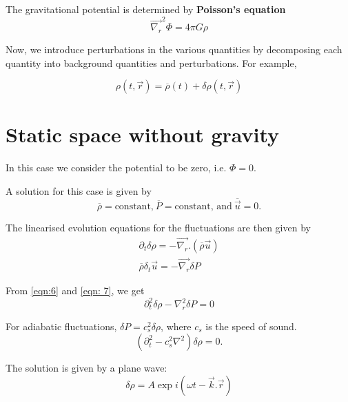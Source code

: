 \documentclass[a4,12pt,oneside]{report}
\begin{document}
   The gravitational potential is determined by {\bf Poisson's equation}
   \begin{equation}\label{key}
   \overrightarrow{\nabla_r}^2\Phi = 4\pi G\rho
   \end{equation}
   
   Now, we introduce perturbations in the various quantities by decomposing each quantity into background quantities and perturbations. For example,
   
   \begin{equation}\label{key}
   \rho(t,\vec{r}) = \overline{\rho}(t) + \delta\rho(t,\vec{r})
   \end{equation}
   
   \section{Static space without gravity}
	In this case we consider the potential to be zero, i.e. $ \Phi = 0 $.
	
	A solution for this case is given by
	\begin{equation}\label{key}
	\overline{\rho}=\text{constant,} \: \overline{P} = \text{constant, and} \: \overline{\vec{u}} = 0.
	\end{equation} 
	
	The linearised evolution equations for the fluctuations are then given by
	\begin{align}
	\partial_t \delta\rho = - \overrightarrow{\nabla_r}.(\overline{\rho}\vec{u}) \label{eqn:6}
	\\
	\overline{\rho}\delta_t \vec{u} = - \overrightarrow{\nabla_r}\delta P \label{eqn: 7}
	\end{align}
	
	From \eqref{eqn:6} and \eqref{eqn: 7}, we get	
	\begin{equation}\label{key}
	\partial_t^2 \delta \rho - \nabla_r^2 \delta P = 0
	\end{equation}
	
	For adiabatic fluctuations, $ \delta P = c_s^2 \delta \rho $, where $ c_s$ is the speed of sound.
	\begin{equation}\label{key}
	(\partial_t^2 - c_s^2\nabla^2) \delta \rho = 0.
	\end{equation}
	
	The solution is given by a plane wave:
	\begin{equation}\label{key}
	\delta \rho = A \exp i(\omega t - \vec{k}.\vec{r})
	\end{equation}
	
\end{document}

